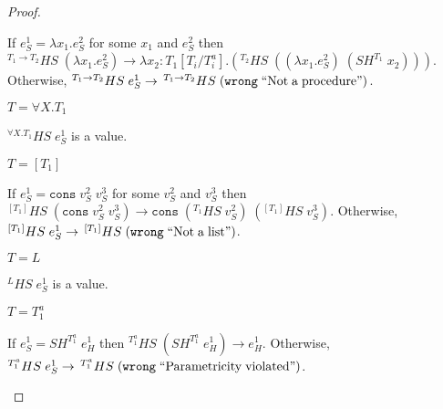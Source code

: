 \begin{theorem}
\begin{proof}
\begin{case}
\begin{case}
If $e_{S}^{1}=\lambda x_{1}.e_{S}^{2}$ for some $x_{1}$ and $e_{S}^{2}$ then $^{T_{1}\rightarrow T_{2}}HS\;(\lambda x_{1}.e_{S}^{2})\rightarrow\lambda x_{2}:T_{1}[T_{i}/T^{a}_{i}].(^{T_{2}}HS\;((\lambda x_{1}.e_{S}^{2})\;(SH^{T_{1}}\;x_{2})))$.  Otherwise, $^{T_{1}\rightarrow T_{2}}HS\;e_{S}^{1}\rightarrow\,^{T_{1}\rightarrow T_{2}}HS\;(\mathtt{wrong}\;\mathrm{``Not\;a\;procedure"})$.
\end{case}
\begin{case}
$T=\forall X.T_{1}$

$^{\forall X.T_{1}}HS\;e_{S}^{1}$ is a value.
\end{case}
\begin{case}
$T=[T_{1}]$

If $e_{S}^{1}=\mathtt{cons}\;v_{S}^{2}\;v_{S}^{3}$ for some $v_{S}^{2}$ and $v_{S}^{3}$ then $^{[T_{1}]}HS\;(\mathtt{cons}\;v_{S}^{2}\;v_{S}^{3})\rightarrow\mathtt{cons}\;(^{T_{1}}HS\;v_{S}^{2})\;(^{[T_{1}]}HS\;v_{S}^{3})$.  Otherwise, $^{[T_{1}]}HS\;e_{S}^{1}\rightarrow\,^{[T_{1}]}HS\;(\mathtt{wrong}\;\mathrm{``Not\;a\;list"})$.
\end{case}
\begin{case}
$T=L$

$^{L}HS\;e_{S}^{1}$ is a value.
\end{case}
\begin{case}
$T=T_{1}^{a}$

If $e_{S}^{1}=SH^{T_{1}^{a}}\;e_{H}^{1}$ then $^{T_{1}^{a}}HS\;(SH^{T_{1}^{a}}\;e_{H}^{1})\rightarrow e_{H}^{1}$.  Otherwise, $^{T_{1}^{a}}HS\;e_{S}^{1}\rightarrow\,^{T_{1}^{a}}HS\;(\mathtt{wrong}\;\mathrm{``Parametricity\;violated"})$.
\end{case}
\end{case}
\end{proof}
\end{theorem}